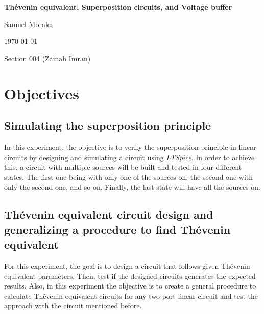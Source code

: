 \documentclass[english,12pt]{article}
\newcommand{\ltspice}[]{\textit{LTSpice} }
\newcommand{\writetitle}{Thévenin equivalent, Superposition circuits, and Voltage buffer}
\newcommand{\writename}{Samuel Morales}
\newcommand{\writesubtitle}{Section 004 (Zainab Imran)}
\begin{document}
\thispagestyle{plain}
	\begin{center}
	\hspace{0pt}
	{\large\textbf{{\writetitle}}}

    \writename
    
    \today
    
	\writesubtitle

\end{center}
\begin{abstract}
    In this experiment, the implementation of powerful circuit theorems is explored. The superposition principle and Thévenin equivalent theorem are proved with specific scenarios. The first one being a computer simulation using \ltspice, while the second one an actual circuit built in the lab. Also, the usage of a voltage buffer is implemented to reduce the load that the waveform has on a speaker circuit, which provided a deep understanding of how such devices work.
\end{abstract}
\newpage
\section{Objectives}
\subsection{Simulating the superposition principle}

In this experiment, the objective is to verify the superposition principle in linear circuits by designing and simulating a circuit using \textit{LTSpice}. In order to achieve this, a circuit with multiple sources will be built and tested in four different states. The first one being with only one of the sources on, the second one with only the second one, and so on. Finally, the last state will have all the sources on. 

\subsection{Thévenin equivalent circuit design and generalizing a procedure to find Thévenin equivalent}

For this experiment, the goal is to design a circuit that follows given Thévenin equivalent parameters. Then, test if the designed circuits generates the expected results. Also, in this experiment the objective is to create a general procedure to calculate Thévenin equivalent circuits for any two-port linear circuit and test the approach with the circuit mentioned before.
\end{document}
